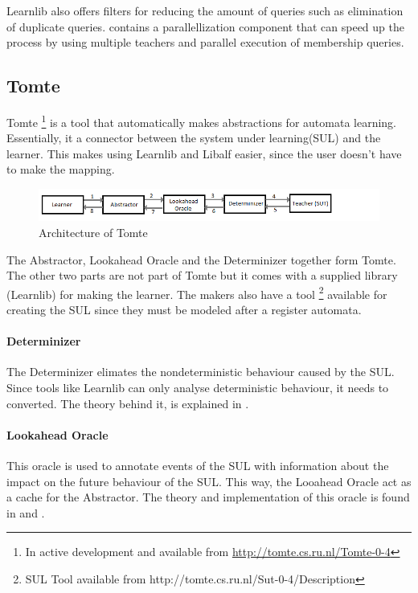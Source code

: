 \documentclass[multi,crop=false,class=article]{standalone}
\begin{document}
Learnlib also offers filters for reducing the amount of queries such as
elimination of duplicate queries. %
contains a parallellization component that can speed up the process by using
multiple teachers and parallel execution of membership
queries\cite{Henrix2015}\cite{Howar2012}.

\subsection{Tomte}
\label{ssec:tomte}
Tomte \footnote{In active development and available from
\url{http://tomte.cs.ru.nl/Tomte-0-4}} is a tool that automatically makes
abstractions for automata learning. Essentially, it a connector between the
system under learning(SUL) and the learner. This makes using Learnlib and Libalf
easier, since the user doesn't have to make the mapping.

\begin{figure}[!ht]
	\includegraphics[width=\textwidth]{Tool_images/tomte_network.png}
	\caption{Architecture of Tomte}
	\label{fig:tomte_arch_interactoin}
\end{figure}

The Abstractor, Lookahead Oracle and the Determinizer together form Tomte. The
other two parts are not part of Tomte but it comes with a supplied library
(Learnlib) for making the learner. The makers also have a tool \footnote{SUL
Tool available from http://tomte.cs.ru.nl/Sut-0-4/Description} available for
creating the SUL since they must be modeled after a register automata.

\paragraph{Determinizer} The Determinizer elimates the nondeterministic
behaviour caused by the SUL. Since tools like Learnlib can only analyse
deterministic behaviour, it needs to converted. The theory behind it, is
explained in \cite{Aarts2015}.

\paragraph{Lookahead Oracle} This oracle is used to annotate events of the SUL
with information about the impact on the future behaviour of the SUL. This way,
the Looahead Oracle act as a cache for the Abstractor. The theory and
implementation of this oracle is found in \cite{Aarts2014} and \cite{Tomte2014}.
\end{document}
